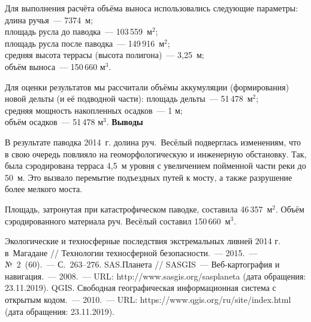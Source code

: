 Для выполнения расчёта объёма выноса использовались следующие параметры:\\
длина ручья~--- 7374 м;\\
площадь русла до паводка~--- 103\,559~м$^2$;\\
площадь русла после паводка~--- 149\,916~м$^2$;\\
средняя высота террасы (высота полигона)~--- 3,25~м;\\
объём выноса~--- 150\,660 м$^3$.

Для оценки результатов мы рассчитали объёмы аккумуляции (формирования) новой дельты (и её подводной части):	\enlargethispage{\baselineskip}
площадь дельты~--- 51\,478~м$^2$;\\
средняя мощность накопленных осадков~--- 1 м;\\
объём осадков~--- 51\,478 м$^3$.
\clearpage
\textbf{Выводы}

В результате паводка 2014~г. долина руч.~Весёлый подверглась изменениям, что в свою очередь повлияло на геоморфологическую и инженерную обстановку. Так, была сэродирована терраса 4,5~м уровня с увеличением пойменной части реки до 50~м. Это вызвало перемытие подъездных путей к мосту, а также разрушение более мелкого моста.

Площадь, затронутая при катастрофическом паводке, составила 46\,357~м$^2$. Объём сэродированного материала руч. Весёлый составил 150\,660~м$^3$.


\begin{thebibliography}{99}

\bibitem{} Экологические и техносферные последствия экстремальных ливней 2014 г. в~Магадане // Технологии техносферной безопасности.~--- 2015.~--- №~2~(60).~--- С.~263--276.
\bibitem{}SAS.Планета // SASGIS~--- Веб-картография и навигация.~--- 2008.~--- URL: http://www.sasgis.org/sasplaneta (дата обращения: 23.11.2019).
\bibitem{}QGIS. Свободная географическая информационная система с открытым кодом.~--- 2010.~--- URL: https://www.qgis.org/ru/site/index.html (дата обращения: 23.11.2019).
    \end{thebibliography}
